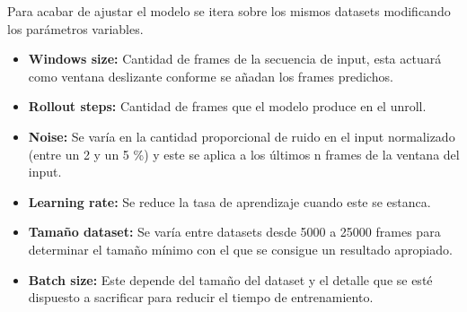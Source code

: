 Para acabar de ajustar el modelo se itera sobre los mismos datasets modificando los parámetros variables.
\begin{itemize}
    \item \textbf{Windows size:} Cantidad de frames de la secuencia de input, esta actuará como ventana deslizante conforme se añadan los frames predichos.
    \item \textbf{Rollout steps:} Cantidad de frames que el modelo produce en el unroll.
    \item \textbf{Noise:} Se varía en la cantidad proporcional de ruido en el input normalizado (entre un 2 y un 5 \%) y este se aplica a los últimos n frames de la ventana del input.
    \item \textbf{Learning rate:} Se reduce la tasa de aprendizaje cuando este se estanca.
    \item \textbf{Tamaño dataset:} Se varía entre datasets desde 5000 a 25000 frames para determinar el tamaño mínimo con el que se consigue un resultado apropiado.
    \item \textbf{Batch size:} Este depende del tamaño del dataset y el detalle que se esté dispuesto a sacrificar para reducir el tiempo de entrenamiento.
\end{itemize}